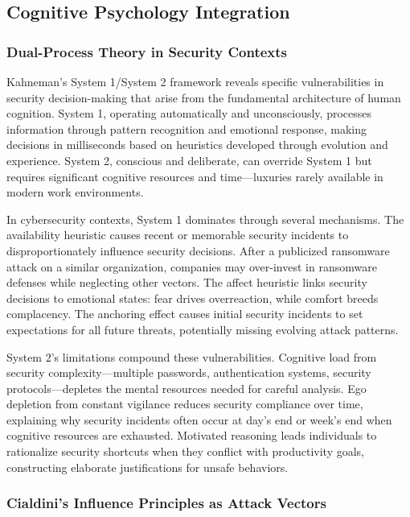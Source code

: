 \documentclass[11pt,a4paper]{article}
\begin{document}
\subsection{Cognitive Psychology Integration}

\subsubsection{Dual-Process Theory in Security Contexts}

Kahneman's System 1/System 2 framework\cite{kahneman2011} reveals specific vulnerabilities in security decision-making that arise from the fundamental architecture of human cognition. System 1, operating automatically and unconsciously, processes information through pattern recognition and emotional response, making decisions in milliseconds based on heuristics developed through evolution and experience. System 2, conscious and deliberate, can override System 1 but requires significant cognitive resources and time—luxuries rarely available in modern work environments.

In cybersecurity contexts, System 1 dominates through several mechanisms. The availability heuristic causes recent or memorable security incidents to disproportionately influence security decisions. After a publicized ransomware attack on a similar organization, companies may over-invest in ransomware defenses while neglecting other vectors. The affect heuristic links security decisions to emotional states: fear drives overreaction, while comfort breeds complacency. The anchoring effect causes initial security incidents to set expectations for all future threats, potentially missing evolving attack patterns.

System 2's limitations compound these vulnerabilities. Cognitive load from security complexity—multiple passwords, authentication systems, security protocols—depletes the mental resources needed for careful analysis. Ego depletion from constant vigilance reduces security compliance over time, explaining why security incidents often occur at day's end or week's end when cognitive resources are exhausted. Motivated reasoning leads individuals to rationalize security shortcuts when they conflict with productivity goals, constructing elaborate justifications for unsafe behaviors.

\subsubsection{Cialdini's Influence Principles as Attack Vectors}
\end{document}
